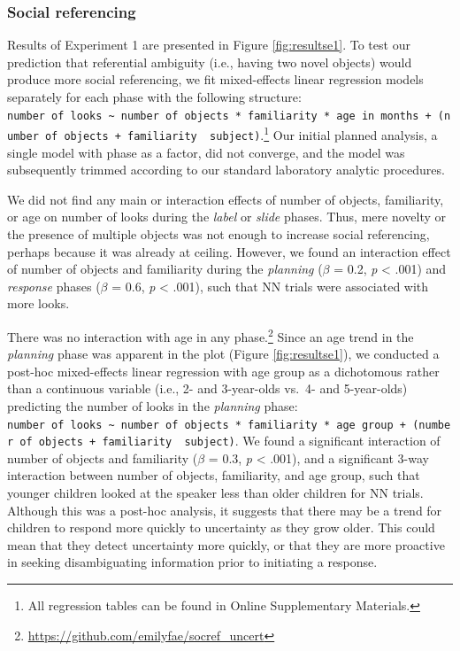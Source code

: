 \documentclass[english,man]{apa6}
\theoremstyle{definition}
\theoremstyle{definition}
\theoremstyle{definition}
\theoremstyle{remark}
\begin{document}
\subsubsection{Social referencing}\label{social-referencing}

Results of Experiment 1 are presented in Figure \ref{fig:resultse1}. To
test our prediction that referential ambiguity (i.e., having two novel
objects) would produce more social referencing, we fit mixed-effects
linear regression models separately for each phase with the following
structure:
\texttt{number\ of\ looks\ \textasciitilde{}\ number\ of\ objects\ *\ familiarity\ *\ age\ in\ months\ +\ (number\ of\ objects\ +\ familiarity\ \textbar{}\ subject)}.\footnote{All
  regression tables can be found in Online Supplementary Materials.} Our
initial planned analysis, a single model with phase as a factor, did not
converge, and the model was subsequently trimmed according to our
standard laboratory analytic procedures.

We did not find any main or interaction effects of number of objects,
familiarity, or age on number of looks during the \emph{label} or
\emph{slide} phases. Thus, mere novelty or the presence of multiple
objects was not enough to increase social referencing, perhaps because
it was already at ceiling. However, we found an interaction effect of
number of objects and familiarity during the \emph{planning} (\(\beta\)
= 0.2, \emph{p} \textless{} .001) and \emph{response} phases (\(\beta\)
= 0.6, \emph{p} \textless{} .001), such that NN trials were associated
with more looks.

There was no interaction with age in any phase.\footnote{\url{https://github.com/emilyfae/socref_uncert}}
Since an age trend in the \emph{planning} phase was apparent in the plot
(Figure \ref{fig:resultse1}), we conducted a post-hoc mixed-effects
linear regression with age group as a dichotomous rather than a
continuous variable (i.e., 2- and 3-year-olds vs.~4- and 5-year-olds)
predicting the number of looks in the \emph{planning} phase:
\texttt{number\ of\ looks\ \textasciitilde{}\ number\ of\ objects\ *\ familiarity\ *\ age\ group\ +\ (number\ of\ objects\ +\ familiarity\ \textbar{}\ subject)}.
We found a significant interaction of number of objects and familiarity
(\(\beta\) = 0.3, \emph{p} \textless{} .001), and a significant 3-way
interaction between number of objects, familiarity, and age group, such
that younger children looked at the speaker less than older children for
NN trials. Although this was a post-hoc analysis, it suggests that there
may be a trend for children to respond more quickly to uncertainty as
they grow older. This could mean that they detect uncertainty more
quickly, or that they are more proactive in seeking disambiguating
information prior to initiating a response.
\end{document}
